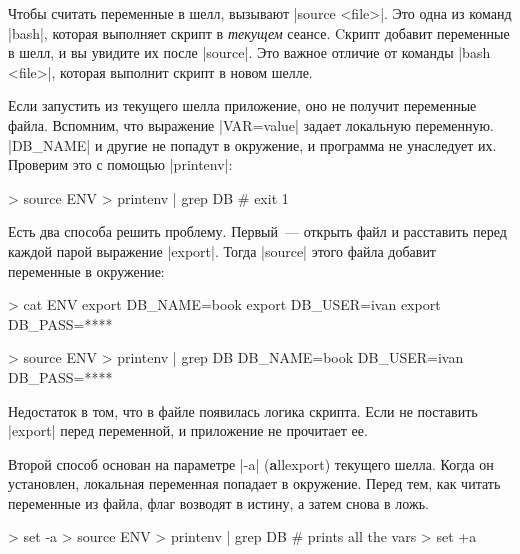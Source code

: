 Чтобы считать переменные в шелл, вызывают \spverb|source <file>|. Это одна из
команд \spverb|bash|, которая выполняет скрипт в \emph{текущем} сеансе. Cкрипт
добавит переменные в шелл, и вы увидите их после \spverb|source|. Это
важное отличие от команды \spverb|bash <file>|, которая выполнит скрипт в новом
шелле.

\begin{english}
\end{english}

Если запустить из текущего шелла приложение, оно не получит переменные
файла. Вспомним, что выражение \spverb|VAR=value| задает локальную
переменную. \spverb|DB_NAME| и другие не попадут в окружение, и программа не
унаследует их. Проверим это с помощью \spverb|printenv|:

\begin{english}
  \begin{bash}
> source ENV
> printenv | grep DB
# exit 1
  \end{bash}
\end{english}

Есть два способа решить проблему. Первый~--- открыть файл и расставить перед
каждой парой выражение \spverb|export|. Тогда \spverb|source| этого файла
добавит переменные в окружение:

\begin{english}
  \begin{bash}
> cat ENV
export DB_NAME=book
export DB_USER=ivan
export DB_PASS=****

> source ENV
> printenv | grep DB
DB_NAME=book
DB_USER=ivan
DB_PASS=****
  \end{bash}
\end{english}

Недостаток в том, что в файле появилась логика скрипта. Если не поставить
\spverb|export| перед переменной, и приложение не прочитает ее.

Второй способ основан на параметре \spverb|-a| (\textbf{a}llexport) текущего
шелла. Когда он установлен, локальная переменная попадает в окружение. Перед
тем, как читать переменные из файла, флаг возводят в истину, а затем снова в
ложь.

\begin{english}
  \begin{bash}
> set -a
> source ENV
> printenv | grep DB
# prints all the vars
> set +a
  \end{bash}
\end{english}

